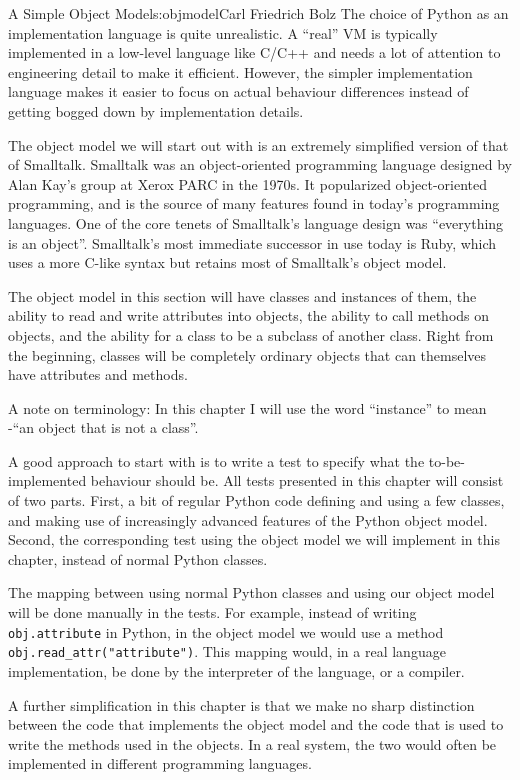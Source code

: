 \begin{aosachapter}{A Simple Object Model}{s:objmodel}{Carl Friedrich Bolz}
The choice of Python as an implementation language is quite unrealistic.
A ``real'' VM is typically implemented in a low-level language like
C/C++ and needs a lot of attention to engineering detail to make it
efficient. However, the simpler implementation language makes it easier
to focus on actual behaviour differences instead of getting bogged down
by implementation details.

\label{method-based-model}

The object model we will start out with is an extremely simplified
version of that of Smalltalk. Smalltalk was an object-oriented
programming language designed by Alan Kay's group at Xerox PARC in the
1970s. It popularized object-oriented programming, and is the source of
many features found in today's programming languages. One of the core
tenets of Smalltalk's language design was ``everything is an object''.
Smalltalk's most immediate successor in use today is Ruby, which uses a
more C-like syntax but retains most of Smalltalk's object model.

The object model in this section will have classes and instances of
them, the ability to read and write attributes into objects, the ability
to call methods on objects, and the ability for a class to be a subclass
of another class. Right from the beginning, classes will be completely
ordinary objects that can themselves have attributes and methods.

A note on terminology: In this chapter I will use the word ``instance''
to mean -``an object that is not a class''.

A good approach to start with is to write a test to specify what the
to-be-implemented behaviour should be. All tests presented in this
chapter will consist of two parts. First, a bit of regular Python code
defining and using a few classes, and making use of increasingly
advanced features of the Python object model. Second, the corresponding
test using the object model we will implement in this chapter, instead
of normal Python classes.

The mapping between using normal Python classes and using our object
model will be done manually in the tests. For example, instead of
writing \texttt{obj.attribute} in Python, in the object model we would
use a method \texttt{obj.read\_attr("attribute")}. This mapping would,
in a real language implementation, be done by the interpreter of the
language, or a compiler.

A further simplification in this chapter is that we make no sharp
distinction between the code that implements the object model and the
code that is used to write the methods used in the objects. In a real
system, the two would often be implemented in different programming
languages.


\end{aosachapter}
